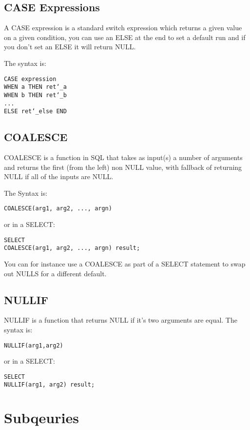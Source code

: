 \documentclass[10pt, english]{article}
\begin{document}
\subsection{CASE Expressions}
A CASE expression is a standard switch expression which returns a given value on a given condition, you can use an ELSE at the end to set a default run 
and if you don't set an ELSE it will return NULL.

The syntax is:

\texttt{CASE expression \\
\hspace*{10pt} WHEN a THEN ret\char`_a \\
\hspace*{10pt} WHEN b THEN ret\char`_b \\
... \\
\hspace*{10pt} ELSE ret\char`_else
END
}

\subsection{COALESCE}
COALESCE is a function in SQL that takes as input(s) a number of arguments and returns the first (from the left) non NULL value, with fallback of returning NULL if 
all of the inputs are NULL. 

The Syntax is:

\texttt{COALESCE(arg1, arg2, ..., argn)}

or in a SELECT:

\texttt{SELECT \\
\hspace*{10pt} COALESCE(arg1, arg2, ..., argn) result;}


You can for instance use a COALESCE as part of a SELECT statement to swap out NULLS for a different default.

\subsection{NULLIF}
NULLIF is a function that returns NULL if it's two arguments are equal. The syntax is:

\texttt{NULLIF(arg1,arg2)}

or in a SELECT:

\texttt{SELECT \\
\hspace*{10pt} NULLIF(arg1, arg2) result;}

\newpage
\section{Subqeuries}
\end{document}
